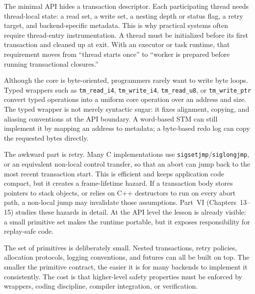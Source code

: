 The minimal API hides a transaction descriptor. Each participating thread needs thread-local state: a read set, a write set, a nesting depth or status flag, a retry target, and backend-specific metadata. This is why practical systems often require thread-entry instrumentation. A thread must be initialized before its first transaction and cleaned up at exit. With an executor or task runtime, that requirement moves from ``thread starts once'' to ``worker is prepared before running transactional closures.''

Although the core is byte-oriented, programmers rarely want to write byte loops. Typed wrappers such as \texttt{tm\_read\_i4}, \texttt{tm\_write\_i4}, \texttt{tm\_read\_u8}, or \texttt{tm\_write\_ptr} convert typed operations into a uniform core operation over an address and size. The typed wrapper is not merely syntactic sugar: it fixes alignment, copying, and aliasing conventions at the API boundary. A word-based STM can still implement it by mapping an address to metadata; a byte-based redo log can copy the requested bytes directly.

The awkward part is retry. Many C implementations use \texttt{sigsetjmp}/\texttt{siglongjmp}, or an equivalent non-local control transfer, so that an abort can jump back to the most recent transaction start. This is efficient and keeps application code compact, but it creates a frame-lifetime hazard. If a transaction body stores pointers to stack objects, or relies on C++ destructors to run on every abort path, a non-local jump may invalidate those assumptions. Part~VI (Chapters~13--15) studies these hazards in detail. At the API level the lesson is already visible: a small primitive set makes the runtime portable, but it exposes responsibility for replay-safe code.

The set of primitives is deliberately small. Nested transactions, retry policies, allocation protocols, logging conventions, and futures can all be built on top. The smaller the primitive contract, the easier it is for many backends to implement it consistently. The cost is that higher-level safety properties must be enforced by wrappers, coding discipline, compiler integration, or verification.

